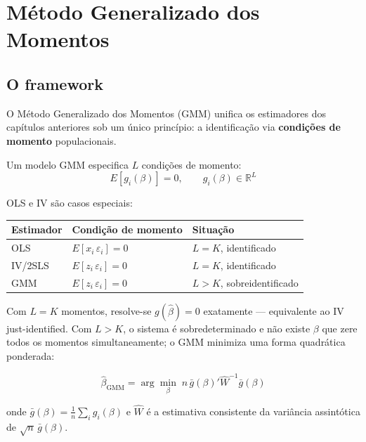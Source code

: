 \chapter{Método Generalizado dos Momentos}
\label{cap:gmm}

\section{O framework}

O Método Generalizado dos Momentos (GMM) unifica os estimadores dos capítulos
anteriores sob um único princípio: a identificação via \textbf{condições de
momento} populacionais.

Um modelo GMM especifica $L$ condições de momento:
\[
  E\!\left[g_i(\beta)\right] = 0, \qquad g_i(\beta) \in \mathbb{R}^L
\]

OLS e IV são casos especiais:

\begin{center}
\begin{tabular}{lll}
\toprule
\textbf{Estimador} & \textbf{Condição de momento} & \textbf{Situação} \\
\midrule
OLS   & $E[x_i\,\varepsilon_i] = 0$ & $L = K$, identificado \\
IV/2SLS & $E[z_i\,\varepsilon_i] = 0$ & $L = K$, identificado \\
GMM   & $E[z_i\,\varepsilon_i] = 0$ & $L > K$, sobreidentificado \\
\bottomrule
\end{tabular}
\end{center}

Com $L = K$ momentos, resolve-se $g(\hat\beta) = 0$ exatamente — equivalente
ao IV just-identified. Com $L > K$, o sistema é sobredeterminado e não existe
$\beta$ que zere todos os momentos simultaneamente; o GMM minimiza uma forma
quadrática ponderada:

\[
  \hat\beta_{\mathrm{GMM}}
  = \arg\min_\beta\; n\, \bar g(\beta)' \hat W^{-1} \bar g(\beta)
\]

onde $\bar g(\beta) = \tfrac{1}{n}\sum_i g_i(\beta)$ e $\hat W$ é a estimativa
consistente da variância assintótica de $\sqrt{n}\,\bar g(\beta)$.

